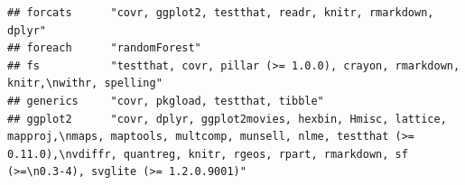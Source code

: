 \documentclass[]{article}
\begin{document}
\begin{verbatim}
## forcats      "covr, ggplot2, testthat, readr, knitr, rmarkdown, dplyr"                                                                                                                                                                                                                                                                                                                                                                                                                                                                                                                                 
## foreach      "randomForest"                                                                                                                                                                                                                                                                                                                                                                                                                                                                                                                                                                            
## fs           "testthat, covr, pillar (>= 1.0.0), crayon, rmarkdown, knitr,\nwithr, spelling"                                                                                                                                                                                                                                                                                                                                                                                                                                                                                                           
## generics     "covr, pkgload, testthat, tibble"                                                                                                                                                                                                                                                                                                                                                                                                                                                                                                                                                         
## ggplot2      "covr, dplyr, ggplot2movies, hexbin, Hmisc, lattice, mapproj,\nmaps, maptools, multcomp, munsell, nlme, testthat (>= 0.11.0),\nvdiffr, quantreg, knitr, rgeos, rpart, rmarkdown, sf (>=\n0.3-4), svglite (>= 1.2.0.9001)"                                                                                                                                                                                                                                                                                                                                                                 

\end{verbatim}
\end{document}
